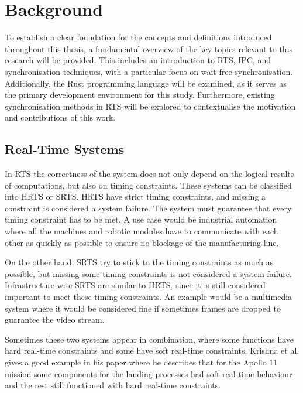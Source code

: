 \chapter{Background}\label{ch:background}

To establish a clear foundation for the concepts and definitions introduced throughout this thesis, a fundamental overview of the key topics relevant to this research will be provided. This includes an introduction to \ac{RTS}, \acf{IPC}, and synchronisation techniques, with a particular focus on wait-free synchronisation. Additionally, the Rust programming language will be examined, as it serves as the primary development environment for this study. Furthermore, existing synchronisation methods in \ac{RTS} will be explored to contextualise the motivation and contributions of this work.

\section{Real-Time Systems}\label{sec:real-time}

In \ac{RTS} the correctness of the system does not only depend on the logical results of computations, but also on timing constraints. These systems can be classified into \ac{HRTS} or \ac{SRTS}. \ac{HRTS} have strict timing constraints, and missing a constraint is considered a system failure. The system must guarantee that every timing constraint has to be met. A use case would be industrial automation where all the machines and robotic modules have to communicate with each other as quickly as possible to ensure no blockage of the manufacturing line. \cite{HardSoftRealTime}

On the other hand, \ac{SRTS} try to stick to the timing constraints as much as possible, but missing some timing constraints is not considered a system failure. Infrastructure-wise \ac{SRTS} are similar to \ac{HRTS}, since it is still considered important to meet these timing constraints. An example would be a multimedia system where it would be considered fine if sometimes frames are dropped to guarantee the video stream. \cite{HardSoftRealTime}

Sometimes these two systems appear in combination, where some functions have hard real-time constraints and some have soft real-time constraints. Krishna et al. gives a good example in his paper where he describes that for the Apollo 11 mission some components for the landing processes had soft real-time behaviour and the rest still functioned with hard real-time constraints. \cite{HardSoftRealTime}

